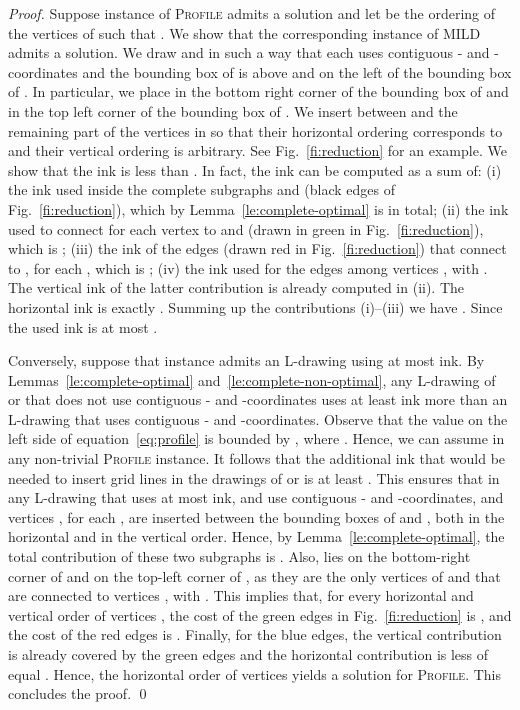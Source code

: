 \documentclass{llncs}
\begin{document}
\begin{proof}
Suppose instance  of \textsc{Profile} admits a solution and let  be the ordering of the vertices of  such that . We show that the corresponding instance  of \textsc{MILD} admits a solution. We draw  and  in such a way that each uses contiguous - and -coordinates and the bounding box of  is above and on the left of the bounding box of . In particular, we place  in the bottom right corner of the bounding box of  and  in the top left corner of the bounding box of . We insert between  and  the remaining part of the vertices in  so that their horizontal ordering corresponds to  and their vertical ordering is arbitrary. See Fig.~\ref{fi:reduction} for an example.
We show that the ink is less than . In fact, the ink can be computed as a sum of: (i) the ink used inside the complete subgraphs  and  (black edges of Fig.~\ref{fi:reduction}), which by Lemma~\ref{le:complete-optimal} is  in total; (ii) the ink used to connect for each  vertex  to  and  (drawn in green in Fig.~\ref{fi:reduction}), which is ; (iii) the ink of the edges (drawn red in Fig.~\ref{fi:reduction}) that connect  to , for each , which is ; (iv) the ink used for the edges among vertices , with . The vertical ink of the latter contribution is already computed in (ii). The horizontal ink is exactly . Summing up the contributions (i)--(iii) we have . Since   the used ink is at most .
   
Conversely, suppose that instance  admits an L-drawing using at most  ink. 
By Lemmas~\ref{le:complete-optimal} and~\ref{le:complete-non-optimal}, any L-drawing of  or  that does not use contiguous - and -coordinates uses at least  ink more than an L-drawing that uses contiguous - and -coordinates. Observe that the value on the left side of equation~\ref{eq:profile} is bounded by , where . Hence, we can assume  in any non-trivial \textsc{Profile} instance. It follows that the additional ink that would be needed to insert grid lines in the drawings of  or  is at least . This ensures that in any L-drawing that uses at most  ink,  and  use contiguous - and -coordinates, and vertices , for each , are inserted between the bounding boxes of  and , both in the horizontal and in the vertical order. Hence, by Lemma~\ref{le:complete-optimal}, the total contribution of these two subgraphs is . 
Also,  lies on the bottom-right corner of  and  on the top-left corner of , as they are the only vertices of  and  that are connected to vertices , with .
This implies that, for every horizontal and vertical order of vertices , the cost of the green edges in Fig.~\ref{fi:reduction} is , and the cost of the red edges is . Finally, for the blue edges, the vertical contribution is already covered by the green edges and the horizontal contribution is less of equal . Hence, the horizontal order of vertices  yields a solution for \textsc{Profile}.
This concludes the proof. \qed
\end{proof}
\end{document}
